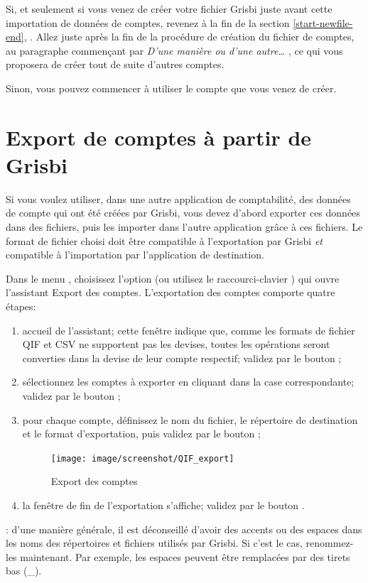 Si, et seulement si vous venez de créer votre fichier Grisbi juste avant cette importation de données de comptes, revenez à la fin de la section \vref{start-newfile-end}, . Allez juste après la fin de la procédure de création du fichier de comptes, au paragraphe commençant par \emph{D'une manière ou d'une autre\ldots{ }}, ce qui vous proposera de créer tout de suite d'autres comptes.

Sinon, vous pouvez commencer à utiliser le compte que vous venez de créer.


\section{Export de comptes à partir de Grisbi\label{move-export}}


Si vous voulez utiliser, dans une autre application de comptabilité, des données de compte qui ont été créées par Grisbi, vous devez d'abord exporter ces données dans des fichiers, puis les importer dans l'autre application grâce à ces fichiers. Le format de fichier choisi doit être compatible à l'exportation par Grisbi \emph{et} compatible à l'importation par l'application de destination.
 
Dans le menu , choisissez l'option   (ou utilisez le raccourci-clavier ) qui ouvre l'assistant Export des comptes. L'exportation des comptes comporte quatre étapes:

\begin{enumerate}
	\item accueil de l'assistant; cette fenêtre indique que, comme les formats de fichier QIF et CSV ne supportent pas les devises, toutes les opérations seront converties dans la devise de leur compte respectif; validez par le bouton ;
	\item sélectionnez les comptes à exporter en cliquant dans la case correspondante; validez par le bouton ;
	\item pour chaque compte, définissez le nom du fichier, le répertoire de destination et le format d'exportation, puis validez par le bouton  ;
	\begin{figure}[t]
	\begin{center}
	\texttt{[image: image/screenshot/QIF\_export]}
	\end{center}
	\caption{Export des comptes}
	\label{QIF-export-img}
	\end{figure}
	
	\item la fenêtre de fin de l'exportation s'affiche; validez par le bouton .
\end{enumerate}

\Attention{}: d'une manière générale, il est déconseillé d'avoir des accents ou des espaces dans les noms des répertoires et fichiers utilisés par Grisbi. Si c'est le cas, renommez-les maintenant. Par exemple, les espaces peuvent être remplacées par des tirets bas (\_).











